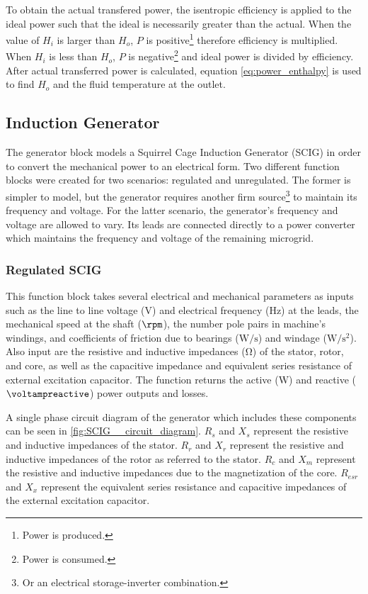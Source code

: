 To obtain the actual transfered power, the isentropic efficiency is applied to the ideal power such that the ideal is necessarily greater than the actual. When the value of $H_i$ is larger than $H_o$, $P$ is positive\footnote{Power is produced.} therefore efficiency is multiplied. When $H_i$ is less than $H_o$, $P$ is negative\footnote{Power is consumed.} and ideal power is divided by efficiency. After actual transferred power is calculated, equation \ref{eq:power_enthalpy} is used to find $H_o$ and the fluid temperature at the outlet.

\subsection{Induction Generator}
The generator block models a Squirrel Cage Induction Generator (SCIG) in order to convert the mechanical power to an electrical form. Two different function blocks were created for two scenarios: regulated and unregulated. The former is simpler to model, but the generator requires another firm source\footnote{Or an electrical storage-inverter combination.} to maintain its frequency and voltage. For the latter scenario, the generator's frequency and voltage are allowed to vary. Its leads are connected directly to a power converter which maintains the frequency and voltage of the remaining microgrid. 

\subsubsection{Regulated SCIG}
This function block takes several electrical and mechanical parameters as inputs such as the line to line voltage ($\si{\volt}$) and electrical frequency ($\si{\hertz}$) at the leads, the mechanical speed at the shaft ($\si{\rpm}$), the number pole pairs in machine's windings, and coefficients of friction due to bearings ($\si{\watt\per\second}$) and windage ($\si{\watt\per\second\squared}$). Also input are the resistive and inductive impedances ($\si{\ohm}$) of the stator, rotor, and core, as well as the capacitive impedance and equivalent series resistance of external excitation capacitor. The function returns the active ($\si{\watt}$) and reactive ($\si{\voltampreactive}$) power outputs and losses.


A single phase circuit diagram of the generator which includes these components can be seen in \autoref{fig:SCIG__circuit_diagram}. $R_s$ and $X_s$ represent the resistive and inductive impedances of the stator. $R_r$ and $X_r$ represent the resistive and inductive impedances of the rotor as referred to the stator. $R_c$ and $X_m$ represent the resistive and inductive impedances due to the magnetization of the core. $R_{esr}$ and $X_x$ represent the equivalent series resistance and capacitive impedances of the external excitation capacitor.

